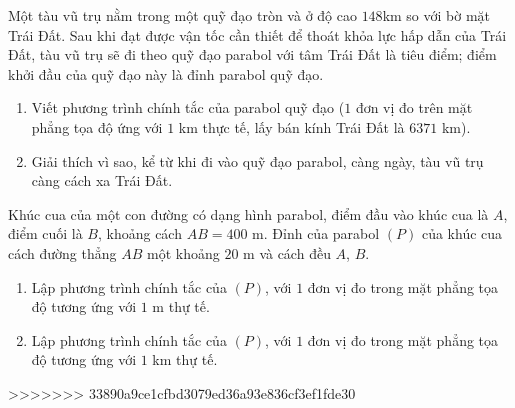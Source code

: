 \begin{bt}%
	Một tàu vũ trụ nằm trong một quỹ đạo tròn và ở độ cao $148$km so với bờ mặt Trái Đất. Sau khi đạt được vận tốc cần thiết để thoát khỏa lực hấp dẫn của Trái Đất, tàu vũ trụ sẽ đi theo quỹ đạo parabol với tâm Trái Đất là tiêu điểm; điểm khởi đầu của quỹ đạo này là đỉnh parabol quỹ đạo.
	\begin{enumerate}
		\item Viết phương trình chính tắc của parabol quỹ đạo ($1$ đơn vị đo trên mặt phẳng tọa độ ứng với $1$ km thực tế, lấy bán kính Trái Đất là $6371$ km).
		\item Giải thích vì sao, kể từ khi đi vào quỹ đạo parabol, càng ngày, tàu vũ trụ càng cách xa Trái Đất.
	\end{enumerate}

\end{bt}

\begin{bt}%
	Khúc cua của một con đường có dạng hình parabol, điểm đầu vào khúc cua là $A$, điểm cuối là $B$, khoảng cách $AB=400$ m. Đỉnh của parabol $(P)$ của khúc cua cách đường  thẳng $AB$ một khoảng $20$ m và cách đều $A$, $B$.
	\begin{enumerate}
		\item Lập phương trình chính tắc của $(P)$, với $1$ đơn vị đo trong mặt phẳng tọa độ tương ứng với $1$ m thự tế.
		\item Lập phương trình chính tắc của $(P)$, với $1$ đơn vị đo trong mặt phẳng tọa độ tương ứng với $1$ km thự tế.
	\end{enumerate}
	
\end{bt}

>>>>>>> 33890a9ce1cfbd3079ed36a93e836cf3ef1fde30
